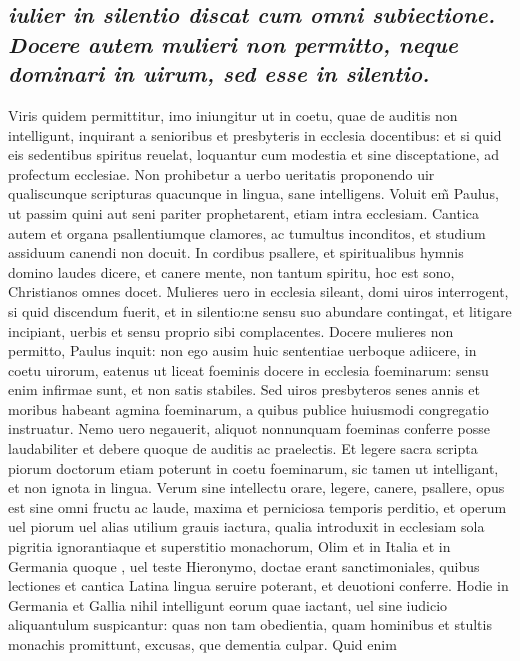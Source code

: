 \documentclass{article}
\begin{document}
\begin{pages}
\subsection*{\textit{iulier in silentio discat cum omni subiectione. Docere autem mulieri non permitto, neque dominari in uirum, sed esse in silentio. }}\pstart Viris quidem permittitur, imo iniungitur ut in coetu, quae de auditis non intelligunt, inquirant a senioribus et presbyteris in ecclesia docentibus: et si quid eis sedentibus spiritus reuelat, loquantur cum modestia et sine disceptatione, ad profectum ecclesiae. Non prohibetur a uerbo ueritatis proponendo uir qualiscunque  scripturas quacunque in lingua, sane intelligens. Voluit em̃ Paulus, ut passim quini aut seni pariter prophetarent, etiam intra ecclesiam. Cantica autem et organa psallentiumque clamores, ac tumultus inconditos, et studium assiduum canendi non docuit. In cordibus psallere, et spiritualibus hymnis domino laudes dicere, et canere mente, non tantum spiritu, hoc est sono, Christianos omnes docet. Mulieres uero in ecclesia sileant, domi uiros interrogent, si quid discendum fuerit, et in silentio:ne sensu suo abundare contingat, et litigare incipiant, uerbis et sensu proprio sibi complacentes. Docere mulieres non permitto, Paulus inquit: non ego ausim huic sententiae uerboque adiicere, in coetu uirorum, eatenus ut liceat foeminis docere in ecclesia foeminarum: sensu enim infirmae sunt, et non satis stabiles. Sed uiros presbyteros senes annis et moribus habeant agmina foeminarum, a quibus publice huiusmodi congregatio instruatur. Nemo uero negauerit, aliquot nonnunquam foeminas conferre posse laudabiliter et debere quoque de auditis ac praelectis. Et legere sacra scripta piorum doctorum etiam poterunt in coetu foeminarum, sic tamen ut intelligant, et non ignota in lingua. Verum sine intellectu orare, legere, canere, psallere, opus est sine omni fructu ac laude, maxima et perniciosa temporis perditio, et operum uel piorum uel alias utilium grauis iactura, qualia introduxit in ecclesiam sola pigritia ignorantiaque et superstitio monachorum, Olim et in Italia et in Germania quoque , uel teste Hieronymo, doctae erant sanctimoniales, quibus lectiones et cantica Latina lingua seruire poterant, et deuotioni conferre. Hodie in Germania et Gallia nihil intelligunt eorum quae iactant, uel sine iudicio aliquantulum suspicantur: quas non tam obedientia, quam hominibus et stultis monachis promittunt, excusas, que dementia culpar. Quid enim  \pend

\end{pages}
\end{document}
